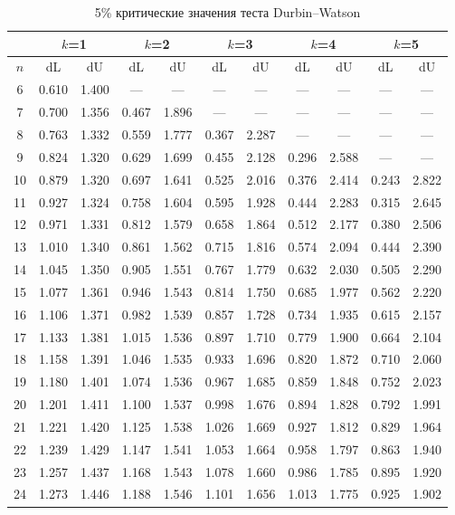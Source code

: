 \documentclass[12pt]{article}
\begin{document}
\begin{table}
\caption{5\% критические значения теста Durbin--Watson}
\begin{center}
{\scriptsize
\begin{tabular}{|c|c|c|c|c|c|c|c|c|c|c|}
	\hline
	& \multicolumn{2}{c|}{$k$=1}& \multicolumn{2}{c|}{$k$=2}& \multicolumn{2}{c|}{$k$=3}
	& \multicolumn{2}{c|}{$k$=4} & \multicolumn{2}{c|}{$k$=5} \\ \hline
	$n$ &dL& dU& dL &dU &dL& dU& dL& dU& dL& dU\\ \hline
	6&0.610&1.400&---&---&---&---&---&---&---&---\\
	7 &0.700&1.356&0.467&1.896&---&---&---&---&---&---\\
	8&0.763&1.332&0.559&1.777&0.367&2.287&---&---&---&---\\
	9&0.824&1.320&0.629&1.699&0.455&2.128&0.296&2.588&---&---\\
	10&0.879&1.320&0.697&1.641&0.525&2.016&0.376&2.414&0.243&2.822\\
	11&0.927&1.324&0.758&1.604&0.595&1.928&0.444&2.283&0.315&2.645\\
	12&0.971&1.331&0.812&1.579&0.658&1.864&0.512&2.177&0.380&2.506\\
	13&1.010&1.340&0.861&1.562&0.715&1.816&0.574&2.094&0.444&2.390\\
	14&1.045&1.350&0.905&1.551&0.767&1.779&0.632&2.030&0.505&2.290\\
	15&1.077&1.361&0.946&1.543&0.814&1.750&0.685&1.977&0.562&2.220\\
	16&1.106&1.371&0.982&1.539&0.857&1.728&0.734&1.935&0.615&2.157\\
	17&1.133&1.381&1.015&1.536&0.897&1.710&0.779&1.900&0.664&2.104\\
	18&1.158&1.391&1.046&1.535&0.933&1.696&0.820&1.872&0.710&2.060\\
	19&1.180&1.401&1.074&1.536&0.967&1.685&0.859&1.848&0.752&2.023\\
	20&1.201&1.411&1.100&1.537&0.998&1.676&0.894&1.828&0.792&1.991\\
	21&1.221&1.420&1.125&1.538&1.026&1.669&0.927&1.812&0.829&1.964\\
	22&1.239&1.429&1.147&1.541&1.053&1.664&0.958&1.797&0.863&1.940\\
	23&1.257&1.437&1.168&1.543&1.078&1.660&0.986&1.785&0.895&1.920\\
	24&1.273&1.446&1.188&1.546&1.101&1.656&1.013&1.775&0.925&1.902\\

\end{tabular}}
\end{center}
\end{table}
\end{document}
